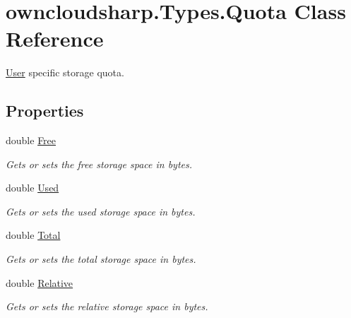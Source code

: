 \hypertarget{classowncloudsharp_1_1_types_1_1_quota}{}\section{owncloudsharp.\+Types.\+Quota Class Reference}
\label{classowncloudsharp_1_1_types_1_1_quota}


\hyperlink{classowncloudsharp_1_1_types_1_1_user}{User} specific storage quota.  


\subsection*{Properties}
\begin{DoxyCompactItemize}
\item 
double \hyperlink{classowncloudsharp_1_1_types_1_1_quota_a3429753c40e37200a27d1d659492ce9d}{Free}
\begin{DoxyCompactList}\small\item\em Gets or sets the free storage space in bytes. \end{DoxyCompactList}\item 
double \hyperlink{classowncloudsharp_1_1_types_1_1_quota_a8f534a14369823baffed8a2f68a47684}{Used}
\begin{DoxyCompactList}\small\item\em Gets or sets the used storage space in bytes. \end{DoxyCompactList}\item 
double \hyperlink{classowncloudsharp_1_1_types_1_1_quota_a75cbc4954f5f516f096b5b584db9333c}{Total}
\begin{DoxyCompactList}\small\item\em Gets or sets the total storage space in bytes. \end{DoxyCompactList}\item 
double \hyperlink{classowncloudsharp_1_1_types_1_1_quota_a3f8af688d478482cdcc1825390d5200a}{Relative}
\begin{DoxyCompactList}\small\item\em Gets or sets the relative storage space in bytes. \end{DoxyCompactList}\end{DoxyCompactItemize}


